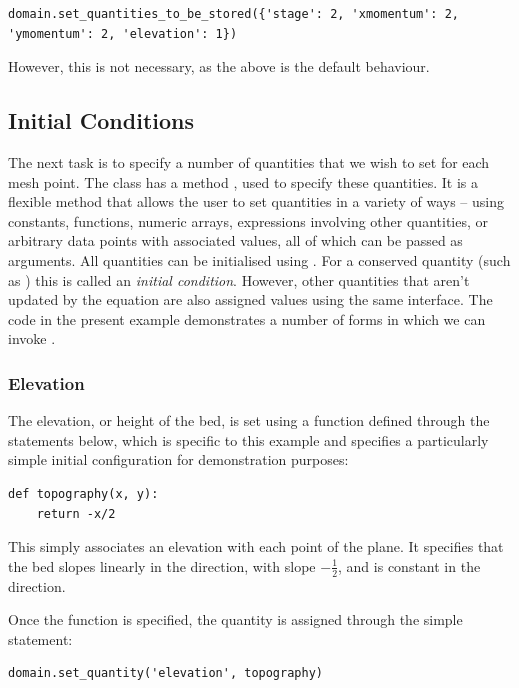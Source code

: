 \documentclass{manual}
\begin{document}
\begin{verbatim}
domain.set_quantities_to_be_stored({'stage': 2, 'xmomentum': 2, 'ymomentum': 2, 'elevation': 1})
\end{verbatim}

However, this is not necessary, as the above is the default behaviour.

\subsection{Initial Conditions}

The next task is to specify a number of quantities that we wish to
set for each mesh point. The class  has a method
, used to specify these quantities. It is a
flexible method that allows the user to set quantities in a variety
of ways -- using constants, functions, numeric arrays, expressions
involving other quantities, or arbitrary data points with associated
values, all of which can be passed as arguments. All quantities can
be initialised using . For a conserved
quantity (such as ) this is called
an \emph{initial condition}. However, other quantities that aren't
updated by the equation are also assigned values using the same
interface. The code in the present example demonstrates a number of
forms in which we can invoke .

\subsubsection{Elevation}

The elevation, or height of the bed, is set using a function
defined through the statements below, which is specific to this
example and specifies a particularly simple initial configuration
for demonstration purposes:

\begin{verbatim}
def topography(x, y):
    return -x/2
\end{verbatim}

This simply associates an elevation with each point  of
the plane.  It specifies that the bed slopes linearly in the
 direction, with slope $-\frac{1}{2}$,  and is constant in
the  direction.

Once the function  is specified, the quantity
 is assigned through the simple statement:

\begin{verbatim}
domain.set_quantity('elevation', topography)
\end{verbatim}
\end{document}

